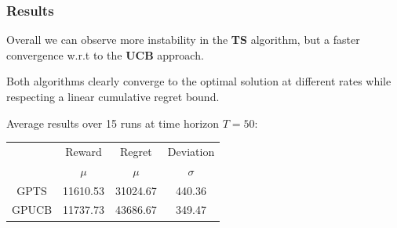 
\begin{frame}

\frametitle{Results}

Overall we can observe more instability in the \textbf{TS} algorithm, but a faster convergence w.r.t to the \textbf{UCB} approach.

Both algorithms clearly converge to the optimal solution at different rates while respecting a linear cumulative regret bound.

Average results over 15 runs at time horizon $T = 50$:

\begin{table}
	\begin{tabular}{|c|cc|c|}
	\hline \hline
		\cellcolor{blue!25} & Reward 	& Regret	& Deviation \\
	\cline{2-4}
		\cellcolor{blue!25} & $\mu$		& $\mu$		& $\sigma$	\\
	\hline \hline
		GPTS 				& 11610.53 	& 31024.67	& 440.36 	\\
	\hline
		GPUCB				& 11737.73	& 43686.67	& 349.47	\\
	\hline \hline
	\end{tabular}
\end{table}

\end{frame}

